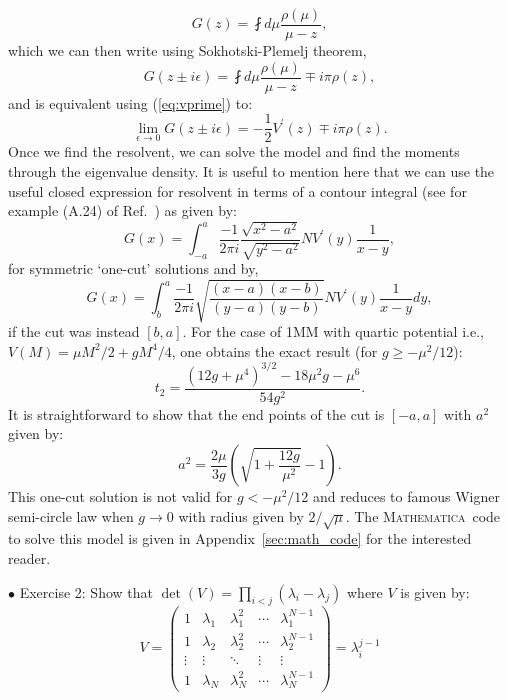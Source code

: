 \documentclass[letter,11pt]{article}
\newcommand{\MA}{\textsc{Mathematica}}
\begin{document}
\begin{equation}
	G(z) = \fint d\mu \frac{\rho(\mu)}{\mu - z},
\end{equation}
which we can then write using Sokhotski-Plemelj theorem,
\begin{equation}
	G(z \pm i \epsilon) = \fint d\mu \frac{\rho(\mu)}{\mu - z} \mp i\pi \rho(z),  
\end{equation}
and is equivalent using (\ref{eq:vprime}) to: 
\begin{equation}
	\lim_{\epsilon \to 0} G(z \pm i \epsilon) = -\frac{1}{2} V^{\prime}(z) \mp i\pi \rho(z).  
\end{equation}
Once we find the resolvent, we can solve the model and find the moments through the eigenvalue density. 
It is useful to mention here that we can use the useful closed expression for 
resolvent in terms of a contour integral (see for example (A.24) of Ref.~\cite{Migdal:1983qrz})
as given by:
\begin{equation}
	G(x) = \int_{-a}^{a} \frac{-1}{2\pi i} \frac{\sqrt{x^2-a^2}}{\sqrt{y^2-a^2}} N V^{\prime}(y) \frac{1}{x-y}, 
\end{equation}
for symmetric `one-cut' solutions and by,
\begin{equation}
	G(x) = \int_{b}^{a} \frac{-1}{2\pi i} \sqrt{\frac{(x-a) (x-b)}{(y-a)(y-b)}}  N V^{\prime}(y) \frac{1}{x-y} dy, 
\end{equation}
if the cut was instead $[b,a]$. For the case of 1MM with quartic potential i.e., 
$V(M) = \mu M^2/2 + gM^4/4$, one obtains the exact result (for $g \ge -\mu^2/12$):
\begin{equation}
\label{eq:exact1MM} 
t_{2} = \frac{(12g+ \mu^4)^{3/2}-18\mu^2g-\mu^6}{54 g^2}. 
\end{equation}
It is straightforward to show that the end points of the cut is $[-a,a]$ with $a^2$ given by:
\begin{equation}
a^2 = \frac{2\mu}{3g} \left( \sqrt{1 + \frac{12g}{\mu^2}} - 1\right). 
\end{equation}
This one-cut solution is not valid for $g < -\mu^2/12$ and reduces to famous Wigner semi-circle law when $g \to 0$ with radius given by $2/\sqrt{\mu}$. The \MA~code to solve this model is given in Appendix~\ref{sec:math_code} for the interested reader. 

\vspace{5mm} 
\begin{mdframed}[backgroundcolor=blue!3] 
	$\bullet$ Exercise 2: Show that $\det(V) = \prod_{i<j} (\lambda_i - \lambda_j)$ where $V$ is given by: 
	\begin{equation*}
		V = 
		\begin{pmatrix}
			1 & \lambda_1 & \lambda_{1}^{2} & \cdots & \lambda_{1}^{N-1} \\
			1 & \lambda_2 & \lambda_{2}^{2} & \cdots & \lambda_{2}^{N-1} \\ 
			\vdots  & \vdots  & \ddots & \vdots  & \vdots \\
			1 & \lambda_N & \lambda_{N}^{2} & \cdots & \lambda_{N}^{N-1} 
		\end{pmatrix} = \lambda_{i}^{j-1} 
	\end{equation*}
	
\end{mdframed} 
\end{document}
